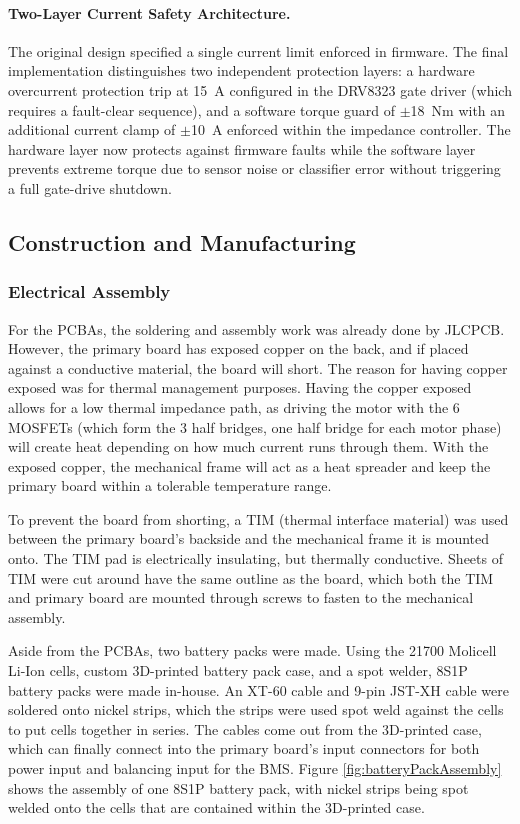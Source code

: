 \documentclass[11pt]{article}
\begin{document}
\paragraph{Two-Layer Current Safety Architecture.}
The original design specified a single current limit enforced in firmware.
The final implementation distinguishes two independent protection layers: a hardware overcurrent protection trip at 15~A configured in the DRV8323 gate driver (which requires a fault-clear sequence), and a software torque guard of $\pm$18~Nm with an additional current clamp of $\pm$10~A enforced within the impedance controller.
The hardware layer now protects against firmware faults while the software layer prevents extreme torque 
due to sensor noise or classifier error without triggering a full gate-drive shutdown.

\subsection{Construction and Manufacturing}
\subsubsection{Electrical Assembly}
For the PCBAs, the soldering and assembly work was already done by JLCPCB. However, the primary board has exposed copper on the back, and if placed against a conductive material, the board will short. The reason for having copper exposed was for thermal management purposes. Having the copper exposed allows for a low thermal impedance path, as driving the motor with the 6 MOSFETs (which form the 3 half bridges, one half bridge for each motor phase) will create heat depending on how much current runs through them. With the exposed copper, the mechanical frame will act as a heat spreader and keep the primary board within a tolerable temperature range.

To prevent the board from shorting, a TIM (thermal interface material) was used between the primary board's backside and the mechanical frame it is mounted onto. The TIM pad is electrically insulating, but thermally conductive. Sheets of TIM were cut around have the same outline as the board, which both the TIM and primary board are mounted through screws to fasten to the mechanical assembly.

Aside from the PCBAs, two battery packs were made. Using the 21700 Molicell Li-Ion cells, custom 3D-printed battery pack case, and a spot welder, 8S1P battery packs were made in-house. An XT-60 cable and 9-pin JST-XH cable were soldered onto nickel strips, which the strips were used spot weld against the cells to put cells together in series. The cables come out from the 3D-printed case, which can finally connect into the primary board's input connectors for both power input and balancing input for the BMS. Figure \ref{fig:batteryPackAssembly} shows the assembly of one 8S1P battery pack, with nickel strips being spot welded onto the cells that are contained within the 3D-printed case.
\end{document}

